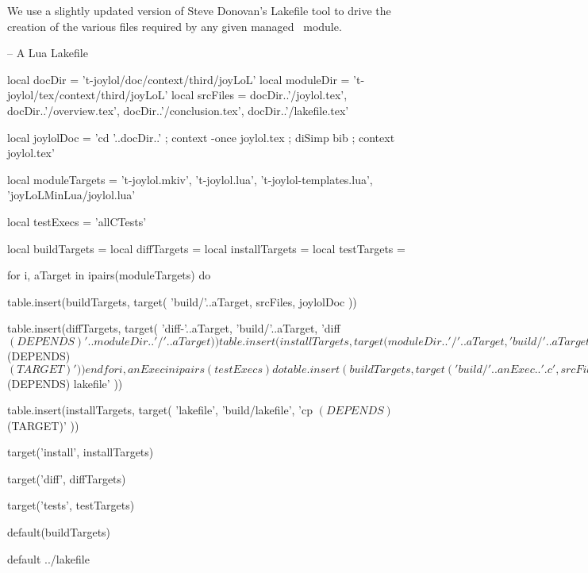 
\startchapter[title=Lakefile]

We use a slightly updated version of Steve Donovan's Lakefile tool to 
drive the creation of the various files required by any given 
 managed \ConTeXt\ module. 

\startLakefile
-- A Lua Lakefile

local docDir    = 't-joylol/doc/context/third/joyLoL'
local moduleDir = 't-joylol/tex/context/third/joyLoL'
local srcFiles = {
  docDir..'/joylol.tex',
  docDir..'/overview.tex',
  docDir..'/conclusion.tex',
  docDir..'/lakefile.tex'
}

local joylolDoc = 
  'cd '..docDir..' ; context -once joylol.tex ; diSimp bib ; context joylol.tex'

local moduleTargets = {
  't-joylol.mkiv',
  't-joylol.lua',
  't-joylol-templates.lua',
  'joyLoLMinLua/joylol.lua'
}

local testExecs = {
  'allCTests'
}

local buildTargets   = { }
local diffTargets    = { }
local installTargets = { }
local testTargets    = { }

for i, aTarget in ipairs(moduleTargets) do

  table.insert(buildTargets, target(
    'build/'..aTarget,
    srcFiles,
    joylolDoc
  ))

  table.insert(diffTargets, target(
    'diff-'..aTarget,
    'build/'..aTarget,
    'diff $(DEPENDS) '..moduleDir..'/'..aTarget
  ))

  table.insert(installTargets, target(
    moduleDir..'/'..aTarget,
    'build/'..aTarget,
    'cp $(DEPENDS) $(TARGET)'
  ))
end

for i, anExec in ipairs(testExecs) do

  table.insert(buildTargets, target(
    'build/'..anExec..'.c',
    srcFiles,
    joylolDoc
  ))

  c.program{
    'build/'..anExec,
    src=anExec..'.c',
    cdir='build',
    needs='lua5.2'
  }
  
  table.insert(testTargets, target(
    'build/'..anExec..'-results.lua',
    'build/'..anExec,
    './build/'..anExec
  ))
end

table.insert(buildTargets, target(
  'build/lakefile',
  srcFiles,
  joylolDoc
))

table.insert(diffTargets, target(
  'diff-lakefile',
  'build/lakefile',
  'diff $(DEPENDS) lakefile'
))

table.insert(installTargets, target(
  'lakefile',
  'build/lakefile',
  'cp $(DEPENDS) $(TARGET)'
))

target('install', installTargets)

target('diff', diffTargets)

target('tests', testTargets)

default(buildTargets)
\stopLakefile

\createLakefileFile%
  {default}%
  {../lakefile}%
  {}

\stopchapter